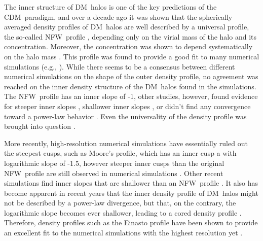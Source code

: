 \documentclass[aps,prd,twocolumn,amsmath,amssymb,floatfix,nofootinbib,10pt]{revtex4}
\newcommand{\eg}{e.g.}
\newcommand{\CDM}{CDM}
\newcommand{\NFW}{NFW}
\newcommand{\DM}{DM}
\begin{document}
The inner structure of \DM\ halos is one of the key predictions of the
\CDM\ paradigm, and over a decade ago it was shown that the
spherically averaged density profiles of \DM\ halos are well described
by a universal profile, the so-called \NFW\ profile
\cite{1995MNRAS.275..720N,1996ApJ...462..563N,1997ApJ...490..493N},
depending only on the virial mass of the halo and its
concentration. Moreover, the concentration was shown to depend
systematically on the halo mass
\cite{1996ApJ...462..563N,1997ApJ...490..493N,2001MNRAS.321..559B,2001ApJ...554..114E,2007MNRAS.381.1450N,2008MNRAS.387..536G}. This
profile was found to provide a good fit to many numerical simulations
(\eg,
\cite{1996MNRAS.281..716C,1997MNRAS.286..865T,1997ApJS..111...73K}).
While there seems to be a consensus between different numerical
simulations on the shape of the outer density profile, no agreement
was reached on the inner density structure of the \DM\ halos found in
the simulations. The \NFW\ profile has an inner slope of -1, other
studies, however, found evidence for steeper inner slopes
\cite{1997ApJ...477L...9F,1998ApJ...499L...5M,1999MNRAS.310.1147M,2000ApJ...544..616G,2001ApJ...554..903K,2001ApJ...557..533F,2004MNRAS.353..624D},
shallower inner slopes \cite{1998ApJ...502...48K}, or didn't find any
convergence toward a power-law behavior
\cite{2003MNRAS.338...14P}. Even the universality of the density
profile was brought into question
\cite{2000ApJ...529L..69J,2000ApJ...535...30J}.

More recently, high-resolution numerical simulations have essentially
ruled out the steepest cusps, such as Moore's profile, which has an
inner cusp a with logarithmic slope of -1.5, however steeper inner
cusps than the original \NFW\ profile are still observed in numerical
simulations \cite{2005MNRAS.364..665D}. Other recent simulations find
inner slopes that are shallower than an \NFW\ profile
\cite{2008MNRAS.385..545K,2008arXiv0808.2981S,2008arXiv0810.1522N}. It
also has become apparent in recent years that the inner density
profile of \DM\ halos might not be described by a power-law
divergence, but that, on the contrary, the logarithmic slope becomes
ever shallower, leading to a cored density profile
\cite{2004MNRAS.349.1039N,2005ApJ...624L..85M,2006AJ....132.2685M,2006AJ....132.2701G,2006MNRAS.365..147S,2008arXiv0808.2981S,2008MNRAS.391.1685S,2008arXiv0810.1522N}. Therefore,
density profiles such as the Einasto profile
\cite{einasto65a,1989A&A...223...89E} have been shown to provide an
excellent fit to the numerical simulations with the highest resolution
yet \cite{2008MNRAS.391.1685S,2008arXiv0808.2981S}.
\end{document}
